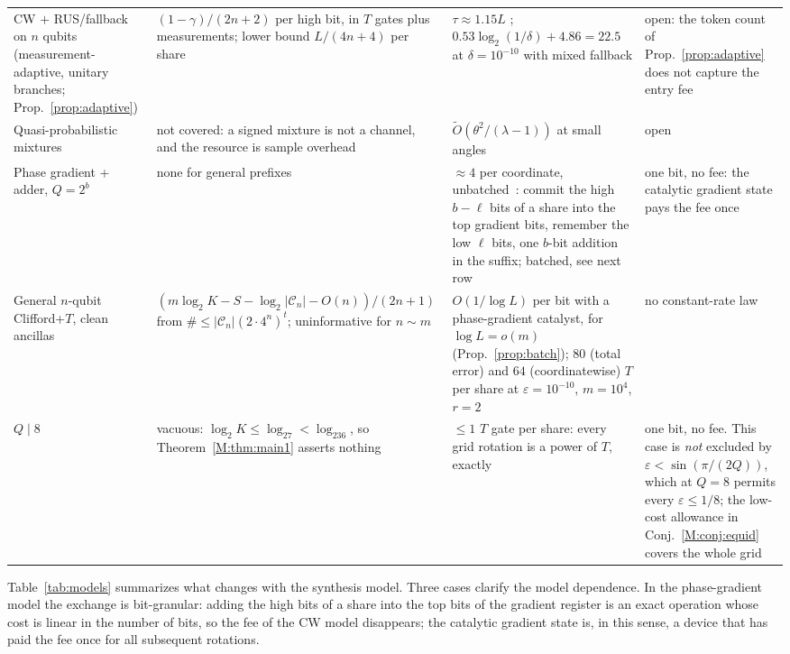 \documentclass[aps,prx,twocolumn,superscriptaddress,nofootinbib,longbibliography]{revtex4-2}
\theoremstyle{plain}
\theoremstyle{definition}
\theoremstyle{remark}
\begin{document}
\begin{table}[t]
\begin{tabular}{@{}p{3.6cm} p{5.2cm} p{4.6cm} p{3.4cm}@{}}
\raggedright CW $+$ RUS/fallback on $n$ qubits (measurement-adaptive, unitary branches; Prop.~\ref{prop:adaptive}) & \raggedright $(1-\gamma)/(2n+2)$ per high bit, in $T$ gates plus measurements; lower bound $L/(4n+4)$ per share & \raggedright $\tau\approx1.15L$ \cite{BRS}; $0.53\log_2(1/\delta)+4.86=22.5$ at $\delta=10^{-10}$ with mixed fallback \cite{KLMPP,Bothe} & \raggedright open: the token count of Prop.~\ref{prop:adaptive} does not capture the entry fee\tabularnewline
\raggedright Quasi-probabilistic mixtures \cite{Bothe} & \raggedright not covered: a signed mixture is not a channel, and the resource is sample overhead & \raggedright $\tilde O(\theta^2/(\lambda-1))$ at small angles \cite{Bothe} & \raggedright open\tabularnewline
\raggedright Phase gradient + adder, $Q=2^b$ & \raggedright none for general prefixes & \raggedright $\approx4$ per coordinate, unbatched~\cite{Gidney}: commit the high $b-\ell$ bits of a share into the top gradient bits, remember the low $\ell$ bits, one $b$-bit addition in the suffix; batched, see next row & \raggedright one bit, no fee: the catalytic gradient state pays the fee once\tabularnewline
\raggedright General $n$-qubit Clifford+$T$, clean ancillas & \raggedright $(m\log_2K-S-\log_2|\mathcal C_n|-O(n))/(2n+1)$ from $\#\le|\mathcal C_n|(2\cdot4^n)^t$; uninformative for $n\sim m$ & \raggedright $O(1/\log L)$ per bit with a phase-gradient catalyst, for $\log L=o(m)$ (Prop.~\ref{prop:batch}); $80$ (total error) and $64$ (coordinatewise) $T$ per share at $\varepsilon=10^{-10}$, $m=10^4$, $r=2$ & \raggedright no constant-rate law\tabularnewline
\raggedright $Q\mid8$ & \raggedright vacuous: $\log_2K\le\log_27<\log_236$, so Theorem~\ref{M:thm:main1} asserts nothing & \raggedright $\le1$ $T$ gate per share: every grid rotation is a power of $T$, exactly & \raggedright one bit, no fee. This case is \emph{not} excluded by $\varepsilon<\sin(\pi/(2Q))$, which at $Q=8$ permits every $\varepsilon\le1/8$; the low-cost allowance in Conj.~\ref{M:conj:equid} covers the whole grid\tabularnewline
\bottomrule
\end{tabular}
\end{table}

Table~\ref{tab:models} summarizes what changes with the synthesis model. Three cases clarify the model dependence. In the phase-gradient model the exchange is bit-granular: adding the high bits of a share into the top bits of the gradient register is an exact operation whose cost is linear in the number of bits, so the fee of the CW model disappears; the catalytic gradient state is, in this sense, a device that has paid the fee once for all subsequent rotations. 
\end{document}
